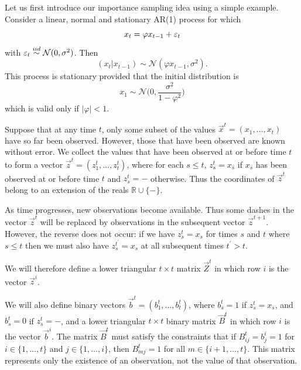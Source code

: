 Let us first introduce our importance sampling idea using a simple example. Consider a linear, normal and stationary AR(1) process for which
\begin{equation*}
    x_{t} = \varphi x_{t-1} + \varepsilon_{t}
\end{equation*}
with $\varepsilon_{t} \stackrel{iid}{\sim} \mathcal{N}(0, \sigma^{2})$. Then
\begin{equation*}
    (x_{t} | x_{t-1}) \sim \mathcal{N} (\varphi x_{t-1}, \sigma^{2}).
\end{equation*}
This process is stationary provided that the initial distribution is
\begin{equation*}
    x_{1} \sim \mathcal{N} \Bigg (0, \frac{\sigma^2}{1- \varphi^2} \Bigg )
\end{equation*}
which is valid only if $|\varphi| < 1$.

Suppose that at any time $t$, only some subset of the values $\vec {x}^{t} = (x_1, \dots, x_{t})$ have so far been observed. However, those that have been observed are known without error. We collect the values that have been observed at or before time $t$ to form a vector $\vec{z}^{t} = (z_1^{t}, \dots, z_{t}^{t})$, where for each $s \leq t$, $z_s^{t} = x_s$ if $x_s$ has been observed at or before time $t$ and $z_s^{t} = -$ otherwise. Thus the coordinates of $\vec{z}^{t}$ belong to an extension of the reals $\mathbb{R} \cup \{ - \}$.

As time progresses, new observations become available. Thus some dashes in the vector $\vec{z}^{t}$ will be replaced by observations in the subsequent vector $\vec{z}^{t+1}$. However, the reverse does not occur: if we have $z_s^{t} = x_s$ for times $s$ and $t$ where $s \leq t$ then we must also have $z_s^{t^{\prime}} = x_s$ at all subsequent times $t^{\prime} > t$.

We will therefore define a lower triangular $t \times t$ matrix $\vec{Z}^{t}$ in which row $i$ is the vector $\vec{z}^{i}$.

We will also define binary vectors $\vec{b}^{t} = (b_1^{t}, \dots, b_{t}^{t})$, where $b_s^{t} = 1$ if $z_s^{t} = x_s$, and $b_s^{t} = 0$ if $z_s^{t} = -$, and a lower triangular $t \times t$ binary matrix $\vec{B}^{t}$ in which row $i$ is the vector $\vec{b}^{i}$.
The matrix $\vec{B}^{t}$ must satisfy the constraints that if $B_{ij}^{t} = b_j^{i} = 1$ for $i \in \{ 1, \ldots, t \}$ and $j \in \{ 1, \ldots, i \}$, then $B_{mj}^{t} = 1$ for all $m \in \{ i+1, \ldots, t \}$. This matrix represents only the existence of an observation, not the value of that observation.

